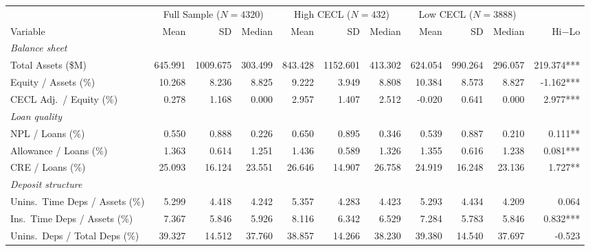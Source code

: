 \begingroup
\centering
\begin{tabular}{lrrr rrr rrr r}
  \tabularnewline \midrule \midrule
  & \multicolumn{3}{c}{Full Sample ($N=4320$)} & \multicolumn{3}{c}{High CECL ($N=432$)} & \multicolumn{3}{c}{Low CECL ($N=3888$)} & \\
  \cmidrule(lr){2-4}\cmidrule(lr){5-7}\cmidrule(lr){8-10}
  Variable & Mean & SD & Median & Mean & SD & Median & Mean & SD & Median & Hi$-$Lo \\
  \midrule
  \emph{Balance sheet} & & & & & & & & & & \\
  \hspace{1em}Total Assets (\$M) & 645.991 & 1009.675 & 303.499 & 843.428 & 1152.601 & 413.302 & 624.054 & 990.264 & 296.057 & 219.374*** \\
  \hspace{1em}Equity / Assets (\%) & 10.268 & 8.236 & 8.825 & 9.222 & 3.949 & 8.808 & 10.384 & 8.573 & 8.827 & -1.162*** \\
  \hspace{1em}CECL Adj.\ / Equity (\%) & 0.278 & 1.168 & 0.000 & 2.957 & 1.407 & 2.512 & -0.020 & 0.641 & 0.000 & 2.977*** \\
  \midrule
  \emph{Loan quality} & & & & & & & & & & \\
  \hspace{1em}NPL / Loans (\%) & 0.550 & 0.888 & 0.226 & 0.650 & 0.895 & 0.346 & 0.539 & 0.887 & 0.210 & 0.111** \\
  \hspace{1em}Allowance / Loans (\%) & 1.363 & 0.614 & 1.251 & 1.436 & 0.589 & 1.326 & 1.355 & 0.616 & 1.238 & 0.081*** \\
  \hspace{1em}CRE / Loans (\%) & 25.093 & 16.124 & 23.551 & 26.646 & 14.907 & 26.758 & 24.919 & 16.248 & 23.136 & 1.727** \\
  \midrule
  \emph{Deposit structure} & & & & & & & & & & \\
  \hspace{1em}Unins.\ Time Deps / Assets (\%) & 5.299 & 4.418 & 4.242 & 5.357 & 4.283 & 4.423 & 5.293 & 4.434 & 4.209 & 0.064 \\
  \hspace{1em}Ins.\ Time Deps / Assets (\%) & 7.367 & 5.846 & 5.926 & 8.116 & 6.342 & 6.529 & 7.284 & 5.783 & 5.846 & 0.832*** \\
  \hspace{1em}Unins.\ Deps / Total Deps (\%) & 39.327 & 14.512 & 37.760 & 38.857 & 14.266 & 38.230 & 39.380 & 14.540 & 37.697 & -0.523 \\

\end{tabular}
